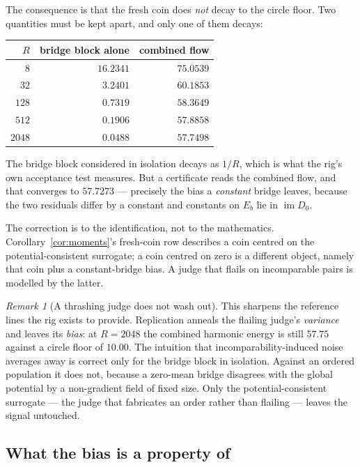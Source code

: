 \documentclass[11pt,a4paper]{article}
\theoremstyle{definition}
\theoremstyle{remark}
\newtheorem{remark}{Remark}
\newcommand{\im}{\operatorname{im}}
\begin{document}
The consequence is that the fresh coin does \emph{not} decay to the circle floor.
Two quantities must be kept apart, and only one of them decays:

\begin{center}
\small
\begin{tabular}{@{}rrr@{}}
\toprule
$R$ & bridge block alone & combined flow \\
\midrule
$8$    & $16.2341$ & $75.0539$ \\
$32$   & $3.2401$  & $60.1853$ \\
$128$  & $0.7319$  & $58.3649$ \\
$512$  & $0.1906$  & $57.8858$ \\
$2048$ & $0.0488$  & $57.7498$ \\
\bottomrule
\end{tabular}
\end{center}

The bridge block considered in isolation decays as $1/R$, which is what the rig's
own acceptance test measures. But a certificate reads the combined flow, and that
converges to $57.7273$ --- precisely the bias a \emph{constant} bridge leaves,
because the two residuals differ by a constant and constants on $E_b$ lie in
$\im D_0$.

The correction is to the identification, not to the mathematics. Corollary~\ref{cor:moments}'s
fresh-coin row describes a coin centred on the potential-consistent surrogate; a
coin centred on zero is a different object, namely that coin plus a
constant-bridge bias. A judge that flails on incomparable pairs is modelled by
the latter.

\begin{remark}[A thrashing judge does not wash out]\label{rem:thrashing}
This sharpens the reference lines the rig exists to provide. Replication anneals
the flailing judge's \emph{variance} and leaves its \emph{bias}: at
$R=2048$ the combined harmonic energy is still $57.75$ against a circle floor of
$10.00$. The intuition that incomparability-induced noise averages away is
correct only for the bridge block in isolation. Against an ordered population it
does not, because a zero-mean bridge disagrees with the global potential by a
non-gradient field of fixed size. Only the potential-consistent surrogate ---
the judge that fabricates an order rather than flailing --- leaves the signal
untouched.
\end{remark}

\subsection{What the bias is a property of}\label{subsec:property}
\end{document}
